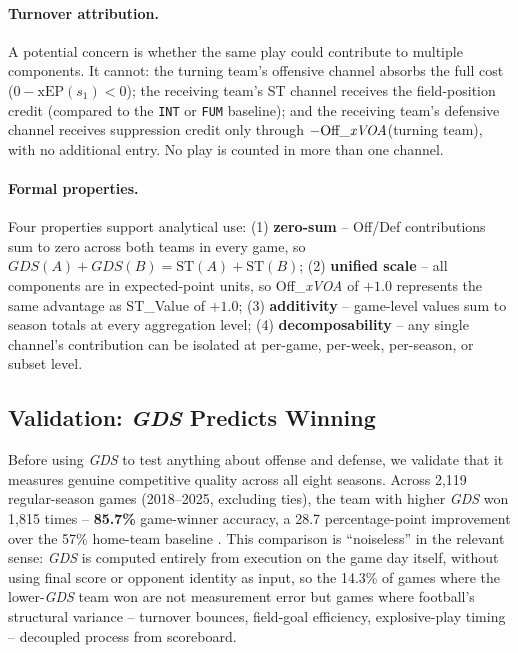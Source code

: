 \documentclass[12pt,a4paper]{article}
\newcommand{\xvoa}{\textit{xVOA}}
\newcommand{\gds}{\textit{GDS}}
\begin{document}
\paragraph{Turnover attribution.} A potential concern is whether the same play could contribute to multiple components. It cannot: the turning team's offensive channel absorbs the full cost ($0 - \text{xEP}(s_1) < 0$); the receiving team's ST channel receives the field-position credit (compared to the \texttt{INT} or \texttt{FUM} baseline); and the receiving team's defensive channel receives suppression credit only through $-\text{Off\_\xvoa{}}$(turning team), with no additional entry. No play is counted in more than one channel.

\paragraph{Formal properties.} Four properties support analytical use: (1) \textbf{zero-sum} -- Off/Def contributions sum to zero across both teams in every game, so $\gds(A) + \gds(B) = \mathrm{ST}(A) + \mathrm{ST}(B)$; (2) \textbf{unified scale} -- all components are in expected-point units, so Off\_\xvoa{} of $+1.0$ represents the same advantage as ST\_Value of $+1.0$; (3) \textbf{additivity} -- game-level values sum to season totals at every aggregation level; (4) \textbf{decomposability} -- any single channel's contribution can be isolated at per-game, per-week, per-season, or subset level.

\subsection{Validation: \gds{} Predicts Winning}
\label{sec:validation}

Before using \gds{} to test anything about offense and defense, we validate that it measures genuine competitive quality across all eight seasons. Across 2,119 regular-season games (2018--2025, excluding ties), the team with higher \gds{} won 1,815 times -- \textbf{85.7\%} game-winner accuracy, a 28.7 percentage-point improvement over the 57\% home-team baseline \citep{lopez2018randomness}. This comparison is ``noiseless'' in the relevant sense: \gds{} is computed entirely from execution on the game day itself, without using final score or opponent identity as input, so the 14.3\% of games where the lower-\gds{} team won are not measurement error but games where football's structural variance -- turnover bounces, field-goal efficiency, explosive-play timing -- decoupled process from scoreboard.
\end{document}

